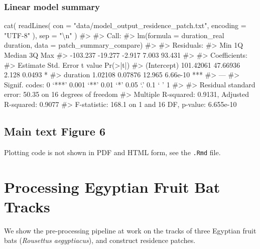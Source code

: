 \documentclass[]{scrreprt}
\newenvironment{Shaded}{}{}
\newcommand{\CharTok}[1]{\textcolor[rgb]{0.00,0.50,0.50}{#1}}
\newcommand{\CommentTok}[1]{\textcolor[rgb]{0.00,0.50,0.00}{#1}}
\newcommand{\DataTypeTok}[1]{#1}
\newcommand{\KeywordTok}[1]{\textcolor[rgb]{0.00,0.00,1.00}{#1}}
\newcommand{\NormalTok}[1]{#1}
\newcommand{\StringTok}[1]{\textcolor[rgb]{0.00,0.50,0.50}{#1}}
\begin{document}
\hypertarget{linear-model-summary}{%
\subsection{Linear model summary}\label{linear-model-summary}}

\begin{Shaded}
\begin{Highlighting}[]
\KeywordTok{cat}\NormalTok{(}
  \KeywordTok{readLines}\NormalTok{(}
    \DataTypeTok{con =} \StringTok{"data/model_output_residence_patch.txt"}\NormalTok{,}
    \DataTypeTok{encoding =} \StringTok{"UTF-8"}
\NormalTok{  ),}
  \DataTypeTok{sep =} \StringTok{"}\CharTok{\textbackslash{}n}\StringTok{"}
\NormalTok{)}
\CommentTok{#> }
\CommentTok{#> Call:}
\CommentTok{#> lm(formula = duration_real ~ duration, data = patch_summary_compare)}
\CommentTok{#> }
\CommentTok{#> Residuals:}
\CommentTok{#>      Min       1Q   Median       3Q      Max }
\CommentTok{#> -103.237  -19.277   -2.917    7.003   93.431 }
\CommentTok{#> }
\CommentTok{#> Coefficients:}
\CommentTok{#>              Estimate Std. Error t value Pr(>|t|)    }
\CommentTok{#> (Intercept) 101.42061   47.66936   2.128   0.0493 *  }
\CommentTok{#> duration      1.02108    0.07876  12.965 6.66e-10 ***}
\CommentTok{#> ---}
\CommentTok{#> Signif. codes:  0 ‘***’ 0.001 ‘**’ 0.01 ‘*’ 0.05 ‘.’ 0.1 ‘ ’ 1}
\CommentTok{#> }
\CommentTok{#> Residual standard error: 50.35 on 16 degrees of freedom}
\CommentTok{#> Multiple R-squared:  0.9131, Adjusted R-squared:  0.9077 }
\CommentTok{#> F-statistic: 168.1 on 1 and 16 DF,  p-value: 6.655e-10}
\end{Highlighting}
\end{Shaded}

\hypertarget{main-text-figure-6}{%
\section{Main text Figure 6}\label{main-text-figure-6}}

Plotting code is not shown in PDF and HTML form, see the \texttt{.Rmd} file.

\hypertarget{processing-egyptian-fruit-bat-tracks}{%
\chapter{Processing Egyptian Fruit Bat Tracks}\label{processing-egyptian-fruit-bat-tracks}}

We show the pre-processing pipeline at work on the tracks of three Egyptian fruit bats (\emph{Rousettus aegyptiacus}), and construct residence patches.
\end{document}
